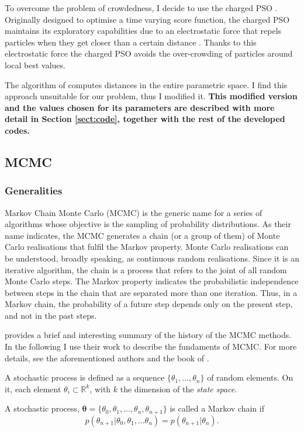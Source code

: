 To overcome the problem of crowdedness, I decide to use the charged PSO \citep{Blackwell2002}. Originally designed to optimise a time varying score function, the charged PSO maintains its exploratory capabilities due to an electrostatic force that repels particles when they get closer than a certain distance \citep{Blackwell2002}. Thanks to this electrostatic force the charged PSO avoids the over-crowding of particles around local best values.

The algorithm of \citet{Blackwell2002} computes distances in the entire parametric space. I find this approach unsuitable for our problem, thus I modified it. \textbf{This modified version and the values chosen for its parameters are described with more detail in Section \ref{sect:code}, together with the rest of the developed codes. }

\subsection{MCMC}
\label{sect:MCMC}
\subsubsection{Generalities}
Markov Chain Monte Carlo (MCMC) is the generic name for a series of algorithms whose objective is the sampling of probability distributions. As their name indicates, the MCMC generates a chain (or a group of them) of Monte Carlo realisations that fulfil the Markov property. Monte Carlo realisations can be understood, broadly speaking, as continuous random realisations. Since it is an iterative algorithm, the chain is a process that refers to the joint of all random Monte Carlo steps. The Markov property indicates the probabilistic independence between steps in the chain that are separated more than one iteration. Thus, in a Markov chain, the probability of a future step depends only on the present step, and not in the past steps.

\citet{Andrieu2003} provides a brief and interesting summary of the history of the MCMC methods. In the following I use their work to describe the fundaments of MCMC. For more details, see the aforementioned authors and the book of \citet{Brooks2011}.

A stochastic process is defined as a sequence  $\{\theta_1,...,\theta_n\}$ of random elements. On it, each element $\theta_i \subset \mathbb{R}^k$,  with $k$ the dimension of the \emph{state space}. 

A stochastic process, $\boldsymbol{\theta}=\{\theta_0,\theta_1,...,\theta_n,\theta_{n+1}\}$ is called a Markov chain if
\begin{equation}
p(\theta_{n+1} | \theta_0,\theta_1,...\theta_n) = p(\theta_{n+1} |\theta_n). \nonumber
\end{equation}

